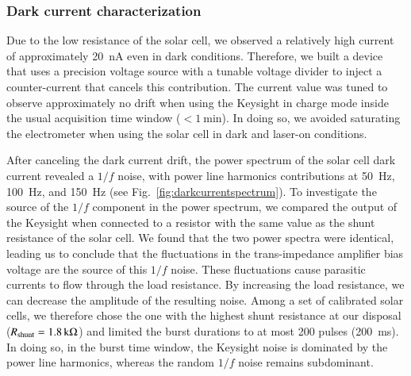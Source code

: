 
\subsubsection{Dark current characterization}

Due to the low resistance of the solar cell, we observed a relatively high current of approximately \SI{20}{\nano\ampere} even in dark conditions. Therefore, we built a device that uses a precision voltage source with a tunable voltage divider to inject a counter-current that cancels this contribution. The current value was tuned to observe approximately no drift when using the Keysight in charge mode inside the usual acquisition time window ($< \SI{1}{\minute}$). In doing so, we avoided saturating the electrometer when using the solar cell in dark and laser-on conditions. 

After canceling the dark current drift, the power spectrum of the solar cell dark current revealed a $1/f$ noise, with power line harmonics contributions at \SI{50}{\hertz}, \SI{100}{\hertz}, and \SI{150}{\hertz} (see Fig.~\ref{fig:darkcurrentspectrum}). To investigate the source of the $1/f$ component in the power spectrum, we compared the output of the Keysight when connected to a resistor with the same value as the shunt resistance of the solar cell. We found that the two power spectra were identical, leading us to conclude that the fluctuations in the trans-impedance amplifier bias voltage are the source of this $1/f$ noise. These fluctuations cause parasitic currents to flow through the load resistance. By increasing the load resistance, we can decrease the amplitude of the resulting noise. Among a set of calibrated solar cells, we therefore chose the one with the highest shunt resistance at our disposal ($R_{\rm shunt} = \SI{1.8}{\kilo\ohm}$) and limited the burst durations to at most 200 pulses (\SI{200}{\ms}). In doing so, in the burst time window, the Keysight noise is dominated by the power line harmonics, whereas the random $1/f$ noise remains subdominant.

